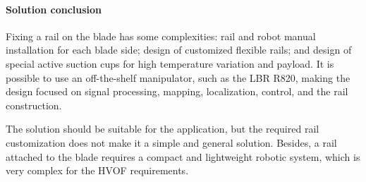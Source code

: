 



\paragraph{Solution conclusion}

Fixing a rail on the blade has some complexities: rail and robot manual
installation for each blade side; design of customized
flexible rails; and design of special active suction cups for high temperature
variation and payload. It is possible to use an off-the-shelf manipulator, such
as the LBR R820, making the design focused on signal processing,
mapping, localization, control, and the rail construction. 

The solution should be suitable for the application, but the required rail
customization does not make it a simple and general solution. Besides, a rail
attached to the blade requires a compact and lightweight robotic system, which
is very complex for the HVOF requirements.

